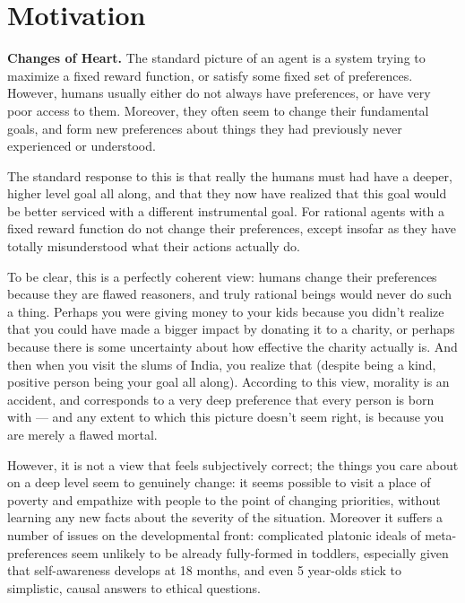 \documentclass{article}
\theoremstyle{definition}
\begin{document}
	
	\section{Motivation}
	\textbf{Changes of Heart.} The standard picture of an agent is a system trying to maximize a fixed reward function, or satisfy some fixed set of preferences. However, humans usually either do not always have preferences, or have very poor access to them. Moreover, they often seem to change their fundamental goals, and form new preferences about things they had previously never experienced or understood. 
	
	The standard response to this is that really the humans must had have a deeper, higher level goal all along, and that they now have realized that this goal would be better serviced with a different instrumental goal. For rational agents with a fixed reward function do not change their preferences, except insofar as they have totally misunderstood what their actions actually do. 
	
	To be clear, this is a perfectly coherent view: humans change their preferences because they are flawed reasoners, and truly rational beings would never do such a thing. Perhaps you were giving money to your kids because you didn't realize that you could have made a bigger impact by donating it to a charity, or perhaps because there is some uncertainty about how effective the charity actually is. And then when you visit the slums of India, you realize that (despite being a kind, positive person being your goal all along). According to this view, morality is an accident, and corresponds to a very deep preference that every person is born with --- and any extent to which this picture doesn't seem right, is because you are merely a flawed mortal.
	
	However, it is not a view that feels subjectively correct; the things you care about on a deep level seem to genuinely change: it seems possible to visit a place of poverty and empathize with people to the point of changing priorities, without learning any new facts about the severity of the situation. Moreover it suffers a number of issues on the developmental front: complicated platonic ideals of meta-preferences seem unlikely to be already fully-formed in toddlers, especially given that self-awareness develops at 18 months, and even 5 year-olds stick to simplistic, causal answers to ethical questions.
	
\end{document}
